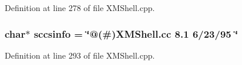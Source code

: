 Definition at line 278 of file XMShell.cpp.
\subsubsection{\setlength{\rightskip}{0pt plus 5cm}char$\ast$ sccsinfo = \char`\"{}@(\#)XMShell.cc 8.1 6/23/95 \char`\"{}\hspace{0.3cm}{\tt  [static]}}\label{XMShell_8cpp_a2}




Definition at line 293 of file XMShell.cpp.
